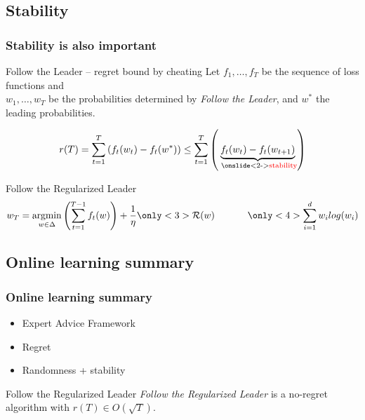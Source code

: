 \documentclass{beamer}
\newcommand{\mR}{\ensuremath{\mathcal{R}}}
\DeclareMathOperator*{\argmin}{argmin}
\newcommand{\inserteqstrut}[1]{%
	\rlap{$\displaystyle#1$}%
	\phantom{\biggesteq}}
\newcommand{\biggesteq}{%
	\vphantom{\sum_{i=1}^{d} w_i log(w_i)}%
	\hphantom{\sum_{i=1}^{d} w_i log(w_i)}%
}
\begin{document}
\subsection{Stability}
\begin{frame}
	\frametitle{Stability is also important}
		\begin{block}{Follow the Leader -- regret bound by cheating}
			Let $f_1 ,\ldots, f_T$ be the sequence of loss functions and \\
			$w_1 ,\ldots, w_T$ be the probabilities determined by \textit{Follow the Leader},
			and $w^*$ the leading probabilities.
			
			\begin{equation*}
				r(T) =  \sum_{t=1}^{T}  \left( f_t(w_t) - f_t(w^*) \right)
				\leq
				\sum_{t=1}^{T} \left( \underbrace{f_t(w_t) - f_t(w_{t+1})}_\text{ \onslide<2->{\textcolor{red}{stability}}} \right)
			\end{equation*}
		\end{block}

\pause[3]
	\begin{block}{Follow the Regularized Leader \only<4>{\textcolor{red}{with entropic regularizer}}}
	\begin{equation*}
	w_T
	= \argmin_{w \in \Delta}  \left(\sum_{t=1}^{T-1} f_t(w) \right) + \frac{1}{\eta}  \only<3>{\inserteqstrut{\mR(w)}} \only<4>{\inserteqstrut{\sum_{i=1}^{d} w_i log(w_i)}}
	\end{equation*}
	\end{block}

\end{frame}


\subsection{Online learning summary}
\begin{frame}
	\frametitle{Online learning summary}
	\begin{itemize}
		\item Expert Advice Framework \pause
		\item Regret \pause
		\item Randomness + stability \pause
	\end{itemize}
	
	\begin{block}{Follow the Regularized Leader}
		\textit{Follow the Regularized Leader} is a no-regret algorithm with $r(T)\in O(\sqrt{T})$.
	\end{block}
\end{frame}
\end{document}
